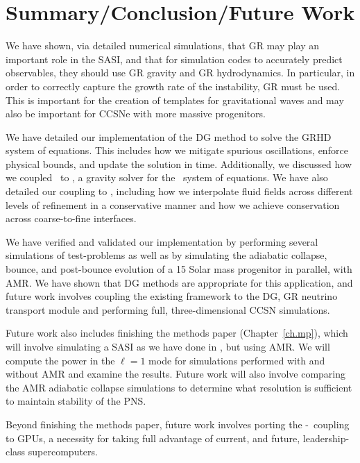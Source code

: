 \chapter{Summary/Conclusion/Future Work}

We have shown, via detailed numerical simulations, that GR may play an
important role in the SASI, and that for simulation codes to
accurately predict observables, they should use GR gravity and GR hydrodynamics.
In particular, in order to correctly capture the growth rate of the
instability, GR must be used.
This is important for the creation of templates for gravitational waves
and may also be important for CCSNe with more massive progenitors.

We have detailed our implementation of the DG method to solve the GRHD
system of equations.
This includes how we mitigate spurious oscillations,
enforce physical bounds, and update the solution in time.
Additionally, we discussed how we coupled \thornado\ to \poseidon,
a gravity solver for the \xcfc\ system of equations.
We have also detailed our coupling to \amrex, including how we interpolate
fluid fields across different levels of refinement in a conservative manner
and how we achieve conservation across coarse-to-fine interfaces.

We have verified and validated our implementation by performing several
simulations of test-problems as well as by simulating the adiabatic collapse,
bounce, and
post-bounce evolution of a 15 Solar mass progenitor in parallel, with AMR.
We have shown that DG methods are appropriate for this application,
and future work involves coupling the existing framework to the DG, GR
neutrino transport module and performing full, three-dimensional
CCSN simulations.

Future work also includes finishing the methods paper (Chapter~\ref{ch.mp}),
which will involve
simulating a SASI as we have done in \citet{dem2023}, but using AMR.
We will compute the power in the $\ell=1$ mode for simulations performed
with and without AMR and examine the results.
Future work will also involve comparing the AMR adiabatic collapse simulations
to determine what resolution is sufficient to maintain stability of the PNS.

Beyond finishing the methods paper, future work involves porting the
\thornado-\amrex\ coupling to GPUs,
a necessity for taking full advantage of current, and future,
leadership-class supercomputers.
